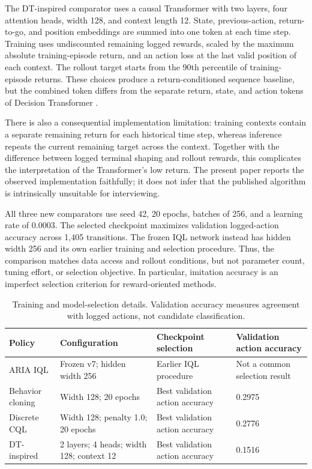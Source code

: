 \documentclass[10pt,a4paper]{article}
\begin{document}
The DT-inspired comparator uses a causal Transformer with two layers, four attention heads, width 128, and context length 12. State, previous-action, return-to-go, and position embeddings are summed into one token at each time step. Training uses undiscounted remaining logged rewards, scaled by the maximum absolute training-episode return, and an action loss at the last valid position of each context. The rollout target starts from the 90th percentile of training-episode returns. These choices produce a return-conditioned sequence baseline, but the combined token differs from the separate return, state, and action tokens of Decision Transformer \cite{dt}.

There is also a consequential implementation limitation: training contexts contain a separate remaining return for each historical time step, whereas inference repeats the current remaining target across the context. Together with the difference between logged terminal shaping and rollout rewards, this complicates the interpretation of the Transformer's low return. The present paper reports the observed implementation faithfully; it does not infer that the published algorithm is intrinsically unsuitable for interviewing.

All three new comparators use seed 42, 20 epochs, batches of 256, and a learning rate of 0.0003. The selected checkpoint maximizes validation logged-action accuracy across 1,405 transitions. The frozen IQL network instead has hidden width 256 and its own earlier training and selection procedure. Thus, the comparison matches data access and rollout conditions, but not parameter count, tuning effort, or selection objective. In particular, imitation accuracy is an imperfect selection criterion for reward-oriented methods.

\begin{table}[htbp]
\centering\small
\caption{Training and model-selection details. Validation accuracy measures agreement with logged actions, not candidate classification.}
\label{tab:training}
\begin{tabularx}{\linewidth}{p{25mm}YYY}
\toprule
Policy & Configuration & Checkpoint selection & Validation action accuracy \\ \midrule
ARIA IQL & Frozen v7; hidden width 256 & Earlier IQL procedure & Not a common selection result \\
Behavior cloning & Width 128; 20 epochs & Best validation action accuracy & 0.2975 \\
Discrete CQL & Width 128; penalty 1.0; 20 epochs & Best validation action accuracy & 0.2776 \\
DT-inspired & 2 layers; 4 heads; width 128; context 12 & Best validation action accuracy & 0.1516 \\
\bottomrule
\end{tabularx}
\end{table}
\end{document}
